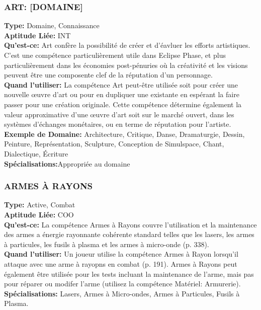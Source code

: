\subsubsection{ART: [DOMAINE]} \textbf{Type:} Domaine, Connaissance\\ \textbf{Aptitude Liée:} INT \\ \textbf{Qu'est-ce:} Art confère la possibilité de créer et d'éavluer les efforts artistiques. C'est une compétence particulièrement utile dans Eclipse Phase, et plus particulièrement dans les économies post-pénuries où la créativité et les visions peuvent être une composente clef de la réputation d'un personnage. \\ \textbf{Quand l'utiliser:} La compétence Art peut-être utilisée soit pour créer une nouvelle œuvre d'art ou pour en dupliquer une existante en espérant la faire passer pour une création originale. Cette compétence détermine également la valeur approximative d'une œuvre d'art soit sur le marché ouvert, dans les systèmes d'échanges monétaires, ou en terme de réputation pour l'artiste. \\ \textbf{Exemple de Domaine:} Architecture, Critique, Danse, Dramaturgie, Dessin, Peinture, Représentation, Sculpture, Conception de Simulspace, Chant, Dialectique, Écriture \\ \textbf{Spécialisations:}Appropriée au domaine 

\subsubsection{ARMES À RAYONS} \textbf{Type:} Active, Combat \\ \textbf{Aptitude Liée:} COO \\ \textbf{Qu'est-ce:} La compétence Armes à Rayons couvre l'utilisation et la maintenance des armes a énergie rayonnante cohérente standard telles que les lasers, les armes à particules, les fusils à plasma et les armes à micro-onde (p. 338). \\ \textbf{Quand l'utiliser:} Un joueur utilise la compétence Armes à Rayon lorsqu'il attaque avec une arme à rayopns en combat (p. 191). Armes à Rayons peut également être utilisée pour les tests incluant la maintenance de l'arme, mais pas pour réparer ou modifer l'arme (utilisez la compétence Matériel: Armurerie). \\ \textbf{Spécialisations:} Lasers, Armes à Micro-ondes, Armes à Particules, Fusils à Plasma. 

